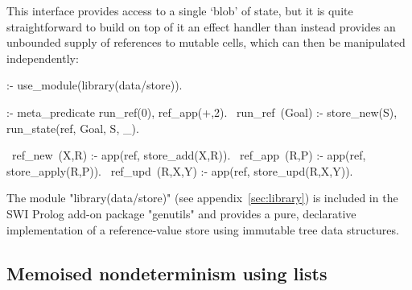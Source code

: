 This interface provides access to a single `blob' of state, but it is quite 
straightforward to build on top of it an effect handler than instead provides an 
unbounded supply of references to mutable cells, which can then be manipulated independently:
\begin{prolog-framed}[name=ccstate]
  :- use_module(library(data/store)).

  :- meta_predicate run_ref(0), ref_app(+,2).
  ~run_ref~(Goal) :- store_new(S), run_state(ref, Goal, S, _).

  ~ref_new~(X,R)   :- app(ref, store_add(X,R)).
  ~ref_app~(R,P)   :- app(ref, store_apply(R,P)).
  ~ref_upd~(R,X,Y) :- app(ref, store_upd(R,X,Y)).
\end{prolog-framed}
The module "library(data/store)" (see appendix~\ref{sec:library}) is included in the SWI Prolog add-on package "genutils"
and provides a pure, declarative implementation of a reference-value store using 
immutable tree data structures.

\subsection{Memoised nondeterminism using lists}
\label{sec:ccmemo}

